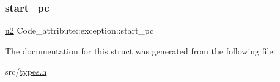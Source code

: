 \subsubsection{\texorpdfstring{start\+\_\+pc}{start\_pc}}
{\footnotesize\ttfamily \hyperlink{types_8h_ae676e9207f57fb921dca7366b2f59c53}{u2} Code\+\_\+attribute\+::exception\+::start\+\_\+pc}



The documentation for this struct was generated from the following file\+:\begin{DoxyCompactItemize}
\item 
src/\hyperlink{types_8h}{types.\+h}\end{DoxyCompactItemize}
